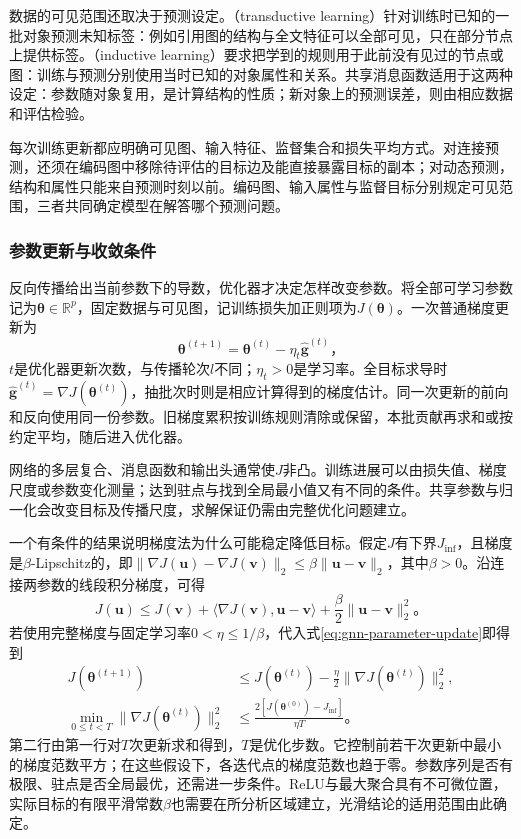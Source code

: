 数据的可见范围还取决于预测设定。（transductive learning）针对训练时已知的一批对象预测未知标签：例如引用图的结构与全文特征可以全部可见，只在部分节点上提供标签。（inductive learning）要求把学到的规则用于此前没有见过的节点或图：训练与预测分别使用当时已知的对象属性和关系。共享消息函数适用于这两种设定：参数随对象复用，是计算结构的性质；新对象上的预测误差，则由相应数据和评估检验。

每次训练更新都应明确可见图、输入特征、监督集合和损失平均方式。对连接预测，还须在编码图中移除待评估的目标边及能直接暴露目标的副本；对动态预测，结构和属性只能来自预测时刻以前。编码图、输入属性与监督目标分别规定可见范围，三者共同确定模型在解答哪个预测问题。

\subsubsection{参数更新与收敛条件}
\label{sec:gnn-optimization-convergence}

反向传播给出当前参数下的导数，优化器才决定怎样改变参数。将全部可学习参数记为$\bm{\theta}\in\mathbb{R}^{p}$，固定数据与可见图，记训练损失加正则项为$J(\bm{\theta})$。一次普通梯度更新为
\begin{equation}
  \bm{\theta}^{(t+1)}=\bm{\theta}^{(t)}
    -\eta_t\widehat{\bm{g}}^{(t)}\text{，}
  \label{eq:gnn-parameter-update}
\end{equation}
$t$是优化器更新次数，与传播轮次$l$不同；$\eta_t>0$是学习率。全目标求导时$\widehat{\bm{g}}^{(t)}=\nabla J(\bm{\theta}^{(t)})$，抽批次时则是相应计算得到的梯度估计。同一次更新的前向和反向使用同一份参数。旧梯度累积按训练规则清除或保留，本批贡献再求和或按约定平均，随后进入优化器。

网络的多层复合、消息函数和输出头通常使$J$非凸。训练进展可以由损失值、梯度尺度或参数变化测量；达到驻点与找到全局最小值又有不同的条件。共享参数与归一化会改变目标及传播尺度，求解保证仍需由完整优化问题建立。

一个有条件的结果说明梯度法为什么可能稳定降低目标。假定$J$有下界$J_{\inf}$，且梯度是$\beta$-Lipschitz的，即$\lVert\nabla J(\bm{u})-\nabla J(\bm{v})\rVert_2\leq\beta\lVert\bm{u}-\bm{v}\rVert_2$，其中$\beta>0$。沿连接两参数的线段积分梯度，可得
\[
  J(\bm{u})\leq J(\bm{v})+
  \langle\nabla J(\bm{v}),\bm{u}-\bm{v}\rangle
  +\frac{\beta}{2}\lVert\bm{u}-\bm{v}\rVert_2^2\text{。}
\]
若使用完整梯度与固定学习率$0<\eta\leq1/\beta$，代入式\eqref{eq:gnn-parameter-update}即得到
\begin{equation}
  \begin{aligned}
    J(\bm{\theta}^{(t+1)})
      &\leq J(\bm{\theta}^{(t)})
        -\frac{\eta}{2}\lVert\nabla J(\bm{\theta}^{(t)})\rVert_2^2,\\
    \min_{0\leq t<T}\lVert\nabla J(\bm{\theta}^{(t)})\rVert_2^2
      &\leq\frac{2[J(\bm{\theta}^{(0)})-J_{\inf}]}{\eta T}\text{。}
  \end{aligned}
  \label{eq:gnn-gradient-descent-bound}
\end{equation}
第二行由第一行对$T$次更新求和得到，$T$是优化步数。它控制前若干次更新中最小的梯度范数平方；在这些假设下，各迭代点的梯度范数也趋于零。参数序列是否有极限、驻点是否全局最优，还需进一步条件。ReLU与最大聚合具有不可微位置，实际目标的有限平滑常数$\beta$也需要在所分析区域建立，光滑结论的适用范围由此确定。

